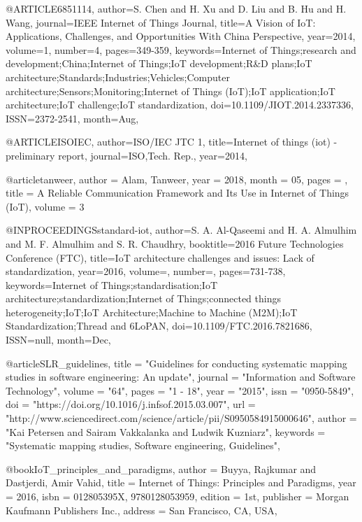 @ARTICLE{6851114,
    author={S. {Chen} and H. {Xu} and D. {Liu} and B. {Hu} and H. {Wang}},
    journal={IEEE Internet of Things Journal},
    title={A Vision of IoT: Applications, Challenges, and Opportunities With China Perspective},
    year={2014},
    volume={1},
    number={4},
    pages={349-359},
    keywords={Internet of Things;research and development;China;Internet of Things;IoT development;R&D plans;IoT architecture;Standards;Industries;Vehicles;Computer architecture;Sensors;Monitoring;Internet of Things (IoT);IoT application;IoT architecture;IoT challenge;IoT standardization},
    doi={10.1109/JIOT.2014.2337336},
    ISSN={2372-2541},
    month={Aug},
}

@ARTICLE{ISOIEC,
    author={ISO/IEC  JTC  1},
    title={Internet  of  things  (iot)  -  preliminary  report},
    journal={ISO,Tech. Rep.},
    year={2014},
}

@article{tanweer,
    author = {Alam, Tanweer},
    year = {2018},
    month = {05},
    pages = {},
    title = {A Reliable Communication Framework and Its Use in Internet of Things (IoT)},
    volume = {3}
}

@INPROCEEDINGS{standard-iot,
    author={S. A. {Al-Qaseemi} and H. A. {Almulhim} and M. F. {Almulhim} and S. R. {Chaudhry}},
    booktitle={2016 Future Technologies Conference (FTC)},
    title={IoT architecture challenges and issues: Lack of standardization},
    year={2016},
    volume={},
    number={},
    pages={731-738},
    keywords={Internet of Things;standardisation;IoT architecture;standardization;Internet of Things;connected things heterogeneity;IoT;IoT Architecture;Machine to Machine (M2M);IoT Standardization;Thread and 6LoPAN},
    doi={10.1109/FTC.2016.7821686},
    ISSN={null},
    month={Dec},
}

@article{SLR_guidelines,
    title = "Guidelines for conducting systematic mapping studies in software engineering: An update",
    journal = "Information and Software Technology",
    volume = "64",
    pages = "1 - 18",
    year = "2015",
    issn = "0950-5849",
    doi = "https://doi.org/10.1016/j.infsof.2015.03.007",
    url = "http://www.sciencedirect.com/science/article/pii/S0950584915000646",
    author = "Kai Petersen and Sairam Vakkalanka and Ludwik Kuzniarz",
    keywords = "Systematic mapping studies, Software engineering, Guidelines",
}

@book{IoT_principles_and_paradigms,
    author = {Buyya, Rajkumar and Dastjerdi, Amir Vahid},
    title = {Internet of Things: Principles and Paradigms},
    year = {2016},
    isbn = {012805395X, 9780128053959},
    edition = {1st},
    publisher = {Morgan Kaufmann Publishers Inc.},
    address = {San Francisco, CA, USA},
} 


